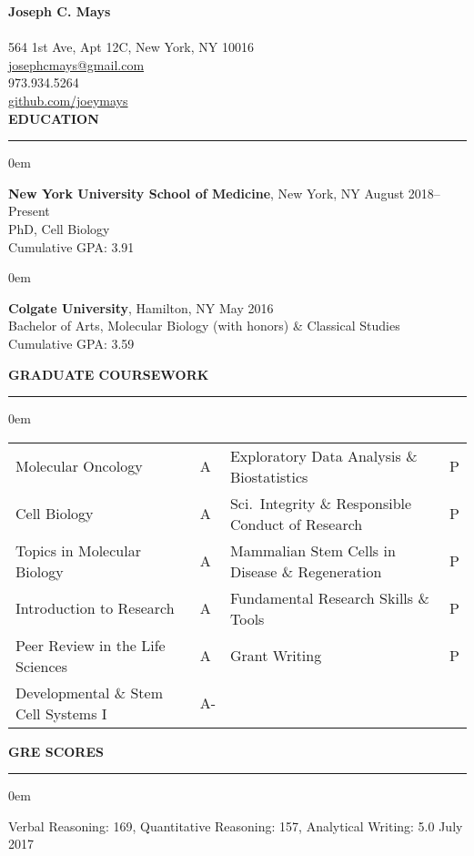 \documentclass[11pt, letterpaper]{article}
\newenvironment{CVSection}{
\begin{addmargin}[2em]{0em}
\begin{samepage}}
{\end{samepage}
\end{addmargin}\bigskip}
\newcommand{\CVHeading}[1]{
\MakeUppercase{\bf #1}
\smallskip
\hrule
\medskip
}
\begin{document}
{\Huge\textbf{Joseph C. Mays}}\\\\
\faHome\hspace{2 mm}564 1st Ave, Apt 12C, New York, NY 10016\\
\faEnvelopeSquare\hspace{2.3 mm}\href{mailto:josephcmays+CV@gmail.com}{josephcmays@gmail.com}\\
\faPhone\hspace{2.4 mm}973.934.5264\\
\faGithub\hspace{2 mm}\href{https://github.com/joeymays}{github.com/joeymays}\\

\CVHeading{Education}
\begin{CVSection}
\textbf{New York University School of Medicine}, New York, NY \hfill August 2018--Present\\
PhD, Cell Biology\\
Cumulative GPA: 3.91
\end{CVSection}

\begin{CVSection}
\textbf{Colgate University}, Hamilton, NY \hfill May 2016\\
Bachelor of Arts, Molecular Biology (with honors) \& Classical Studies\\
Cumulative GPA: 3.59
\end{CVSection}

\CVHeading{Graduate Coursework}
\begin{CVSection}
\begin{tabular}{ll|ll}
Molecular Oncology & A & Exploratory Data Analysis \& Biostatistics & P\\
Cell Biology & A & Sci.~Integrity \& Responsible Conduct of Research & P\\
Topics in Molecular Biology & A & Mammalian Stem Cells in Disease \& Regeneration & P\\
Introduction to Research & A & Fundamental Research Skills \& Tools & P\\

Peer Review in the Life Sciences & A & Grant Writing & P\\
Developmental \& Stem Cell Systems I & A-\\

\end{tabular}
\end{CVSection}

\CVHeading{GRE Scores}
\begin{CVSection}
Verbal Reasoning: 169, Quantitative Reasoning: 157, Analytical Writing: 5.0 \hfill July 2017
\end{CVSection}
\end{document}
